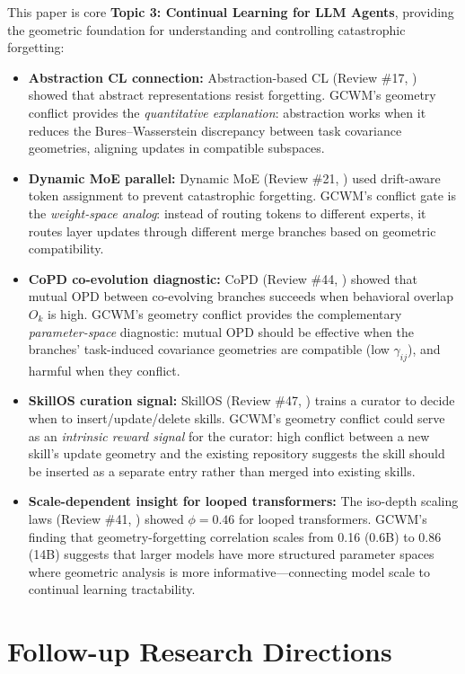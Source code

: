 \documentclass[11pt]{article}
\begin{document}
This paper is core \textbf{Topic 3: Continual Learning for LLM Agents}, providing the geometric foundation for understanding and controlling catastrophic forgetting:

\begin{itemize}
    \item \textbf{Abstraction CL connection:} Abstraction-based CL (Review \#17, \cite{abstraction}) showed that abstract representations resist forgetting. GCWM's geometry conflict provides the \emph{quantitative explanation}: abstraction works when it reduces the Bures--Wasserstein discrepancy between task covariance geometries, aligning updates in compatible subspaces.
    \item \textbf{Dynamic MoE parallel:} Dynamic MoE (Review \#21, \cite{dynamicmoe}) used drift-aware token assignment to prevent catastrophic forgetting. GCWM's conflict gate is the \emph{weight-space analog}: instead of routing tokens to different experts, it routes layer updates through different merge branches based on geometric compatibility.
    \item \textbf{CoPD co-evolution diagnostic:} CoPD (Review \#44, \cite{copd}) showed that mutual OPD between co-evolving branches succeeds when behavioral overlap $O_k$ is high. GCWM's geometry conflict provides the complementary \emph{parameter-space} diagnostic: mutual OPD should be effective when the branches' task-induced covariance geometries are compatible (low $\gamma_{ij}$), and harmful when they conflict.
    \item \textbf{SkillOS curation signal:} SkillOS (Review \#47, \cite{skillos}) trains a curator to decide when to insert/update/delete skills. GCWM's geometry conflict could serve as an \emph{intrinsic reward signal} for the curator: high conflict between a new skill's update geometry and the existing repository suggests the skill should be inserted as a separate entry rather than merged into existing skills.
    \item \textbf{Scale-dependent insight for looped transformers:} The iso-depth scaling laws (Review \#41, \cite{isodepth}) showed $\phi = 0.46$ for looped transformers. GCWM's finding that geometry-forgetting correlation scales from 0.16 (0.6B) to 0.86 (14B) suggests that larger models have more structured parameter spaces where geometric analysis is more informative---connecting model scale to continual learning tractability.
\end{itemize}

\section{Follow-up Research Directions}
\end{document}

